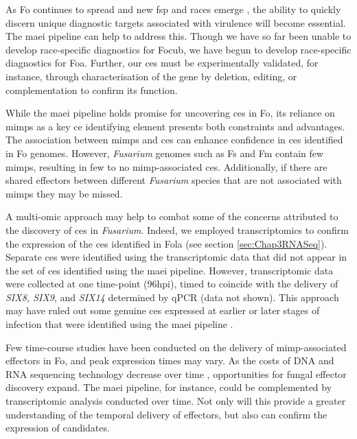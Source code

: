 As \ac{Fo} continues to spread and new \ac{fsp} and races emerge \parencite{Edel-Hermann2019, Henry2020, Mestdagh2023}, the ability to quickly discern unique diagnostic targets associated with virulence will become essential. The \ac{maei} pipeline can help to address this. Though we have so far been unable to develop race-specific diagnostics for \ac{Focub}, we have begun to develop race-specific diagnostics for \acf{Foa}. Further, our \acfp{ce} must be experimentally validated, for instance, through characterisation of the gene by deletion, editing, or complementation to confirm its function. 

While the \ac{maei} pipeline holds promise for uncovering \acp{ce} in \ac{Fo}, its reliance on \acp{mimp} as a key \ac{ce} identifying element presents both constraints and advantages. The association between \acp{mimp} and \acp{ce} can enhance confidence in \acp{ce} identified in \ac{Fo} genomes. However, \textit{Fusarium} genomes such as \acl{Fs} and \acl{Fm} contain few \acp{mimp}, resulting in few to no \ac{mimp}-associated \acp{ce}. Additionally, if there are shared effectors between different \textit{Fusarium} species that are not associated with \acp{mimp} they may be missed. 

A multi-omic approach may help to combat some of the concerns attributed to the discovery of \acp{ce} in \textit{Fusarium}. Indeed, we employed transcriptomics to confirm the expression of the \acp{ce} identified in \ac{Fola} (see section \ref{sec:Chap3RNASeq}). Separate \acp{ce} were identified using the transcriptomic data that did not appear in the set of \acp{ce} identified using the \ac{maei} pipeline. However, transcriptomic data were collected at one time-point (96\ac{hpi}), timed to coincide with the delivery of \textit{SIX8, SIX9}, and \textit{SIX14} determined by qPCR (data not shown). This approach may have ruled out some genuine \acp{ce} expressed at earlier or later stages of infection that were identified using the  \ac{maei} pipeline \parencite{Toruno2016}. 

Few time-course studies have been conducted on the delivery of \ac{mimp}-associated effectors in \ac{Fo}, and peak expression times may vary. As the costs of DNA and RNA sequencing technology decrease over time \parencite{Chan2005, Hu2021}, opportunities for fungal effector discovery expand. The \ac{maei} pipeline, for instance, could be complemented by transcriptomic analysis conducted over time. Not only will this provide a greater understanding of the temporal delivery of effectors, but also can confirm the expression of candidates.

